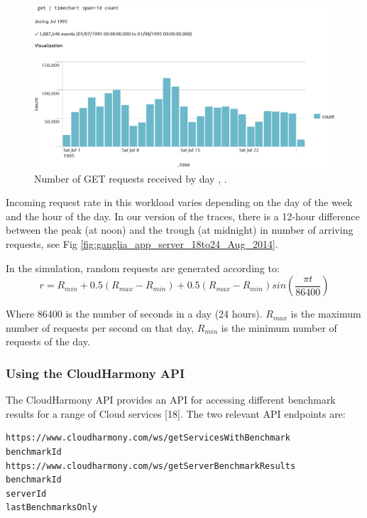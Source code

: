 \begin{figure}[!htbp]
\centering
\includegraphics[width=\textwidth,keepaspectratio]{Figures/QueueingTheory/get.png}
\caption{Number of GET requests received by day \cite{plotly_ClarkNet-HTTP_get}, \cite{ClarkNet-HTTP}.}
\label{fig:_ClarkNet-HTTP_get}
\end{figure}

Incoming request rate in this workload varies depending on the day of the
week and the hour of the day. In our version of the
traces, there is a 12-hour difference between the peak (at noon)
and the trough (at midnight) in number of arriving requests, see Fig \ref{fig:ganglia_app_server_18to24_Aug_2014}.

In the simulation, random requests are generated according to:
\begin{equation}\label{eq:web_workload}
r = R_{min} + 0.5(R_{max} - R_{min}) + 0.5(R_{max} - R_{min}) sin(\frac{\pi t}{86400}) 
\end{equation}

Where 86400 is the number of seconds in a day (24 hours). $R_{max}$ is the maximum number of requests per second on that day, $R_{min}$ is the minimum number of requests of the day.

\subsubsection{Using the CloudHarmony API}

The CloudHarmony API provides an API for accessing different benchmark results for a
range of Cloud services [18]. The two relevant API endpoints are:
\begin{lstlisting}
https://www.cloudharmony.com/ws/getServicesWithBenchmark
benchmarkId
https://www.cloudharmony.com/ws/getServerBenchmarkResults
benchmarkId
serverId
lastBenchmarksOnly
\end{lstlisting}

